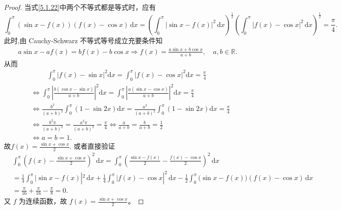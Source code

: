 \documentclass[../../main.tex]{subfiles}%
\begin{document}
\begin{proof}
当式\eqref{5.1.22}中两个不等式都是等式时，应有
\[
\int_{0}^{\pi} (\sin x - f(x))(f(x) - \cos x) \, \mathrm{d}x
= \left( \int_{0}^{\pi} |\sin x - f(x)|^2 \, \mathrm{d}x \right)^{\frac{1}{2}} \left( \int_{0}^{\pi} |f(x) - \cos x|^2 \, \mathrm{d}x \right)^{\frac{1}{2}} = \frac{\pi}{4}.
\]
此时,由 Cauchy-Schwarz 不等式等号成立充要条件知
\begin{align*}
a\sin x-af\left( x \right) =bf\left( x \right) -b\cos x\Longrightarrow f\left( x \right) =\frac{a\sin x+b\cos x}{a+b},\quad a,b\in \mathbb{R} .
\end{align*}
从而
\begin{align*}
&\qquad \,\, \int_0^{\pi}{\left| f\left( x \right) -\sin x \right|^2\mathrm{d}x}=\int_0^{\pi}{\left| f\left( x \right) -\cos x \right|^2\mathrm{d}x}=\frac{\pi}{4}
\\
&\Longleftrightarrow \int_0^{\pi}{\left| \frac{b\left( \cos x-\sin x \right)}{a+b} \right|^2\mathrm{d}x}=\int_0^{\pi}{\left| \frac{a\left( \sin x-\cos x \right)}{a+b} \right|^2\mathrm{d}x}=\frac{\pi}{4}
\\
&\Longleftrightarrow \frac{b^2}{\left( a+b \right) ^2}\int_0^{\pi}{\left( 1-\sin 2x \right) \mathrm{d}x}=\frac{a^2}{\left( a+b \right) ^2}\int_0^{\pi}{\left( 1-\sin 2x \right) \mathrm{d}x}=\frac{\pi}{4}
\\
&\Longleftrightarrow \frac{b^2\pi}{\left( a+b \right) ^2}=\frac{a^2\pi}{\left( a+b \right) ^2}=\frac{\pi}{4}\Longleftrightarrow \frac{a}{a+b}=\frac{b}{a+b}=\frac{1}{2}
\\
&\Longleftrightarrow a=b=1.
\end{align*}
故$f\left( x \right) =\frac{\sin x+\cos x}{2}.$
或者直接验证
\begin{align*}
&\int_0^{\pi}{\left( f(x)-\frac{\sin x+\cos x}{2} \right) ^2\,\mathrm{d}x}=\int_0^{\pi}{\left( \frac{\sin x-f(x)}{2}-\frac{f(x)-\cos x}{2} \right) ^2\,\mathrm{d}x}
\\
&=\frac{1}{4}\int_0^{\pi}{|\sin x}-f(x)|^2\,\mathrm{d}x+\frac{1}{4}\int_0^{\pi}{|f(x)}-\cos x|^2\,\mathrm{d}x
-\frac{1}{2}\int_0^{\pi}{(\sin x}-f(x))(f(x)-\cos x)\,\mathrm{d}x
\\
&=\frac{\pi}{16}+\frac{\pi}{16}-\frac{\pi}{8}=0.
\end{align*}
又 \( f \) 为连续函数，故 \( f(x) = \frac{\sin x + \cos x}{2} \)。

\end{proof}
\end{document}
